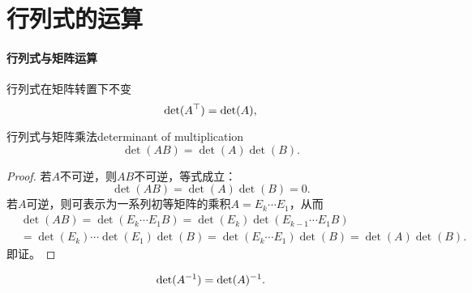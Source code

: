 \section{行列式的运算}
\paragraph{行列式与矩阵运算}
行列式在矩阵转置下不变
\[
	\det(A^\top)=\det(A),
\]
\begin{theorem}{行列式与矩阵乘法}{determinant of multiplication}
	\begin{equation}
		\det(AB)=\det(A)\det(B).
	\end{equation}
\end{theorem}
\begin{proof}
	若$A$不可逆，则$AB$不可逆，等式成立：
	\[
		\det(AB)=\det(A)\det(B)=0.
	\]
	若$A$可逆，则可表示为一系列初等矩阵的乘积$A=E_k\cdots E_1$，从而
	\begin{align*}
		&\det(AB)=\det(E_k\cdots E_1B)=\det(E_k)\det(E_{k-1}\cdots E_1B)\\
		&=\det(E_k)\cdots\det(E_1)\det(B)=\det(E_k\cdots E_1)\det(B)=\det(A)\det(B).
	\end{align*}
	即证。
\end{proof}
\begin{corollary}
	\begin{align}
		\det(A^{-1})=\det(A)^{-1}.
	\end{align}
\end{corollary}


